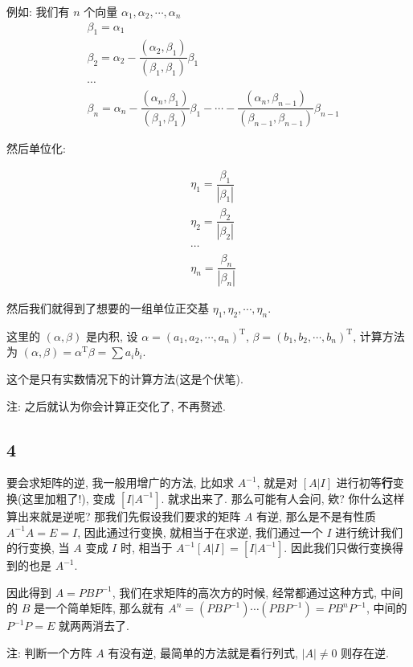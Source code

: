 \documentclass[a4paper, draft]{article}
\begin{document}
例如:  
我们有 $n$ 个向量 $\alpha_1,\alpha_2,\cdots,\alpha_n$
$$
\begin{aligned}
    &\beta_1=\alpha_1\\
    &\beta_2=\alpha_2-\dfrac{(\alpha_2,\beta_1)}{(\beta_1,\beta_1)}\beta_1\\
    &\cdots\\
    &\beta_n=\alpha_n-\dfrac{(\alpha_n,\beta_1)}{(\beta_1,\beta_1)}\beta_1-\cdots-\dfrac{(\alpha_n,\beta_{n-1})}{(\beta_{n-1},\beta_{n-1})}\beta_{n-1}
\end{aligned}
$$

然后单位化:  

$$
\begin{aligned}
    &\eta_1=\dfrac{\beta_1}{|\beta_1|}\\
    &\eta_2=\dfrac{\beta_2}{|\beta_2|}\\
    &\cdots\\
    &\eta_n=\dfrac{\beta_n}{|\beta_n|}    
\end{aligned}
$$

然后我们就得到了想要的一组单位正交基 $\eta_1,\eta_2,\cdots,\eta_n$.

这里的 $(\alpha,\beta)$ 是内积, 
设 $\alpha=(a_1,a_2,\cdots,a_n)^{\text{T}}$, $\beta=(b_1,b_2,\cdots,b_n)^{\text{T}}$, 
计算方法为 $(\alpha,\beta)=\alpha^{\text{T}}\beta=\sum a_ib_i$.

这个是只有实数情况下的计算方法(这是个伏笔).

注: 之后就认为你会计算正交化了, 不再赘述.

\subsection*{4}

要会求矩阵的逆, 我一般用增广的方法, 比如求 $A^{-1}$, 就是对 $[A|I]$ 进行初等\textbf{行}变换(这里加粗了!), 变成 $[I|A^{-1}]$. 就求出来了. 
那么可能有人会问, 欸? 你什么这样算出来就是逆呢? 那我们先假设我们要求的矩阵 $A$ 有逆, 那么是不是有性质 $A^{-1}A=E=I$, 因此通过行变换, 
就相当于在求逆, 我们通过一个 $I$ 进行统计我们的行变换, 当 $A$ 变成 $I$ 时, 相当于 $A^{-1}[A|I]=[I|A^{-1}]$. 因此我们只做行变换得到的也是 $A^{-1}$.


因此得到 $A=PBP^{-1}$, 我们在求矩阵的高次方的时候, 经常都通过这种方式, 
中间的 $B$ 是一个简单矩阵, 那么就有 $A^n=(PBP^{-1})\cdots(PBP^{-1})=PB^nP^{-1}$, 
中间的 $P^{-1}P=E$ 就两两消去了.

注: 判断一个方阵 $A$ 有没有逆, 最简单的方法就是看行列式, $|A|\not=0$ 则存在逆.
\end{document}
